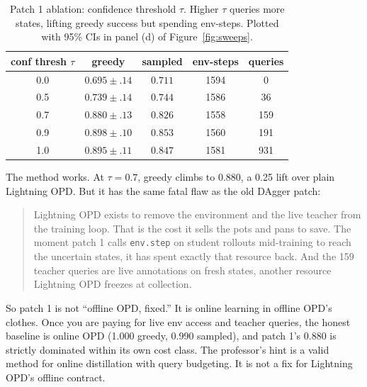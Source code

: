 \documentclass[11pt]{article}
\newcommand{\code}[1]{\texttt{#1}}
\begin{document}
\begin{table}[h]
\centering
\small
\begin{tabular}{c c c c c}
\toprule
\textbf{conf thresh $\tau$} & \textbf{greedy} & \textbf{sampled} & \textbf{env-steps} & \textbf{queries} \\
\midrule
0.0  & $0.695 \pm .14$ & $0.711$ & 1594 & 0 \\
0.5  & $0.739 \pm .14$ & $0.744$ & 1586 & 36 \\
0.7  & $0.880 \pm .13$ & $0.826$ & 1558 & 159 \\
0.9  & $0.898 \pm .10$ & $0.853$ & 1560 & 191 \\
1.0  & $0.895 \pm .11$ & $0.847$ & 1581 & 931 \\
\bottomrule
\end{tabular}
\caption{Patch 1 ablation: confidence threshold $\tau$. Higher $\tau$ queries more
states, lifting greedy success but spending env-steps. Plotted with 95\% CIs in
panel (d) of Figure~\ref{fig:sweeps}.}
\label{tab:active-ablation}
\end{table}

The method works. At $\tau=0.7$, greedy climbs to $0.880$, a 0.25 lift over plain
Lightning OPD. But it has the same fatal flaw as the old DAgger patch:

\begin{quote}\small
Lightning OPD exists to remove the environment and the live teacher from
the training loop. That is the cost it sells the pots and pans to save. The moment
patch 1 calls \code{env.step} on student rollouts mid-training to reach the uncertain
states, it has spent exactly that resource back. And the 159 teacher queries are live
annotations on fresh states, another resource Lightning OPD freezes at collection.
\end{quote}

So patch 1 is not ``offline OPD, fixed.'' It is online learning in offline OPD's
clothes. Once you are paying for live env access and teacher queries, the honest
baseline is online OPD (1.000 greedy, 0.990 sampled), and patch 1's 0.880 is
strictly dominated within its own cost class. The professor's hint is a valid method
for online distillation with query budgeting. It is not a fix for Lightning
OPD's offline contract.
\end{document}
